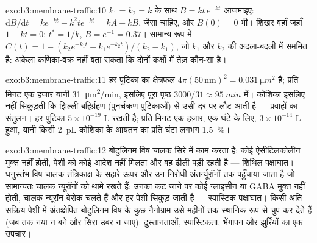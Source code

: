 \begin{solution}{exo:b3:membrane-traffic:10}
$k_{1} = k_{2} = k$ के साथ $B = kt\,e^{-kt}$ आज़माइए: $\mathrm{d}B/\mathrm{d}t
= k e^{-kt} - k^{2}t e^{-kt} = kA - kB$, जैसा चाहिए, और $B(0) = 0$ भी।
शिखर वहाँ जहाँ $1 - kt = 0$: $t^{*} = 1/k$, $B = e^{-1} = 0.37$। सामान्य
रूप में $C(t) = 1 - (k_{2}e^{-k_{1}t} - k_{1}e^{-k_{2}t})/(k_{2} - k_{1})$,
जो $k_{1}$ और $k_{2}$ की अदला-बदली में सममित है: अकेला कणिका-वक्र
नहीं बता सकता कि दोनों कक्षों में तेज़ कौन-सा है।
\end{solution}

\begin{solution}{exo:b3:membrane-traffic:11}
हर पुटिका का क्षेत्रफल $4\pi(50\,\text{nm})^{2} = \qty{0.031}{\micro
m^2}$ है; प्रति मिनट एक हज़ार यानी \qty{31}{\micro m^2/min}, इसलिए पूरा
पृष्ठ $3000/31 \approx \qty{95}{min}$ में। कोशिका इसलिए नहीं सिकुड़ती
कि झिल्ली बहिर्ग्रहण (पुनर्चक्रण पुटिकाओं) से उसी दर पर लौट आती है
--- प्रवाहों का संतुलन। हर पुटिका $5\times 10^{-19}$ L रखती है; प्रति
मिनट एक हज़ार, एक घंटे के लिए, $3\times 10^{-14}$ L हुआ, यानी किसी
\qty{2}{pL} कोशिका के आयतन का प्रति घंटा लगभग \qty{1.5}{\%}।
\end{solution}

\begin{solution}{exo:b3:membrane-traffic:12}
बोटुलिनम विष चालक सिरे में काम करता है: कोई ऐसीटिलकोलीन मुक्त नहीं
होती, पेशी को कोई आदेश नहीं मिलता और वह ढीली पड़ी रहती है --- शिथिल
पक्षाघात। धनुस्तंभ विष चालक तंत्रिकाक्ष के सहारे ऊपर और उन निरोधी
अंतर्न्यूरॉनों तक पहुँचाया जाता है जो सामान्यतः चालक न्यूरॉनों को थामे
रखते हैं; उनका  कट जाने पर कोई ग्लाइसीन या GABA मुक्त नहीं होती,
चालक न्यूरॉन बेरोक चलते हैं और हर पेशी सिकुड़ जाती है --- स्पास्टिक
पक्षाघात। किसी अति-सक्रिय पेशी में अंतःक्षेपित बोटुलिनम विष के कुछ
नैनोग्राम उसे महीनों तक स्थानिक रूप से चुप कर देते हैं (जब तक नया
 न बने और सिरा उबर न जाए): दुस्तानताओं, स्पास्टिकता, भेंगापन और
झुर्रियों का एक उपचार।
\end{solution}

